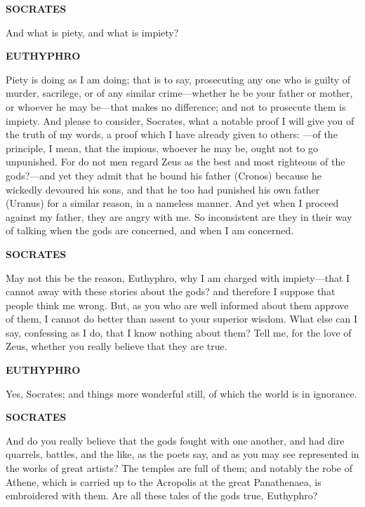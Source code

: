 \documentclass[11pt,letter]{article}
\begin{document}
\par \textbf{SOCRATES}
\par   And what is piety, and what is impiety?

\par \textbf{EUTHYPHRO}
\par   Piety is doing as I am doing; that is to say, prosecuting any one who is guilty of murder, sacrilege, or of any similar crime—whether he be your father or mother, or whoever he may be—that makes no difference; and not to prosecute them is impiety. And please to consider, Socrates, what a notable proof I will give you of the truth of my words, a proof which I have already given to others: —of the principle, I mean, that the impious, whoever he may be, ought not to go unpunished. For do not men regard Zeus as the best and most righteous of the gods?—and yet they admit that he bound his father (Cronos) because he wickedly devoured his sons, and that he too had punished his own father (Uranus) for a similar reason, in a nameless manner. And yet when I proceed against my father, they are angry with me. So inconsistent are they in their way of talking when the gods are concerned, and when I am concerned.

\par \textbf{SOCRATES}
\par   May not this be the reason, Euthyphro, why I am charged with impiety—that I cannot away with these stories about the gods? and therefore I suppose that people think me wrong. But, as you who are well informed about them approve of them, I cannot do better than assent to your superior wisdom. What else can I say, confessing as I do, that I know nothing about them? Tell me, for the love of Zeus, whether you really believe that they are true.

\par \textbf{EUTHYPHRO}
\par   Yes, Socrates; and things more wonderful still, of which the world is in ignorance.

\par \textbf{SOCRATES}
\par   And do you really believe that the gods fought with one another, and had dire quarrels, battles, and the like, as the poets say, and as you may see represented in the works of great artists? The temples are full of them; and notably the robe of Athene, which is carried up to the Acropolis at the great Panathenaea, is embroidered with them. Are all these tales of the gods true, Euthyphro?
\end{document}
